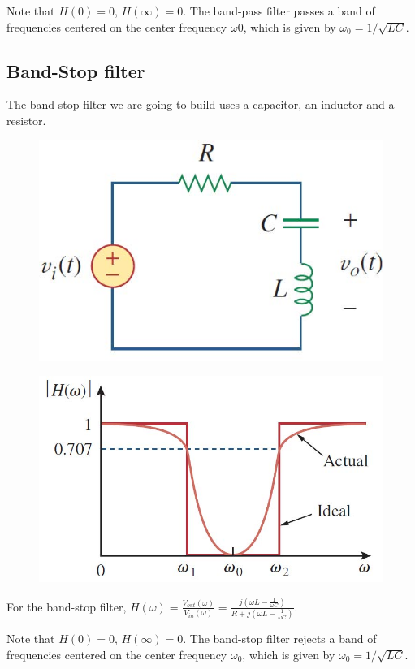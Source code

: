 \documentclass[a4paper]{report}
\begin{document}
Note that $H(0)=0$, $H(\infty)=0$. The band-pass filter passes a band of frequencies centered on the center frequency $\omega 0$, which is given by $\omega_0=1/\sqrt{LC}$.
\subsection{Band-Stop filter}
The band-stop filter we are going to build uses a capacitor, an inductor and a resistor.
\begin{figure}[H]
	\centering
	\includegraphics[width=0.8\linewidth]{7.jpg}
\end{figure}
\begin{figure}[H]
	\centering
	\includegraphics[width=0.8\linewidth]{8.jpg}
\end{figure}
For the band-stop filter, $H(\omega)=\frac{V_{out}(\omega)}{V_{in}(\omega)}=\frac{j(\omega L-\frac{1}{\omega C})}{R+j(\omega L-\frac{1}{\omega C})}$.

Note that $H(0)=0$, $H(\infty)=0$. The band-stop filter rejects a band of frequencies centered on the center frequency $\omega_0$, which is given by $\omega_0=1/\sqrt{LC}$.
\end{document}
